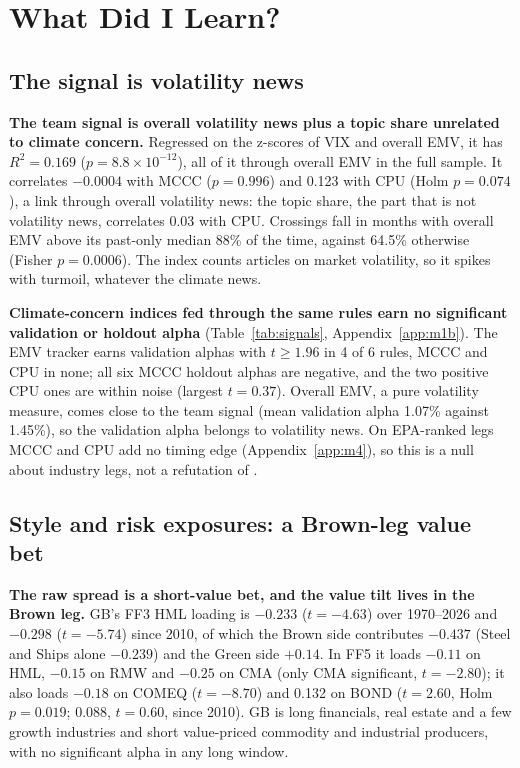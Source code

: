 \clearpage
\section{What Did I Learn?}
\label{sec:learn}

\subsection{The signal is volatility news}
\label{sec:signal}

\textbf{The team signal is overall volatility news plus a topic share unrelated to climate concern.} Regressed on the z-scores of VIX and overall EMV, it has $R^2=0.169$ ($p=8.8\times10^{-12}$), all of it through overall EMV in the full sample. It correlates $-0.0004$ with MCCC ($p=0.996$) and 0.123 with CPU (Holm $p=0.074$), a link through overall volatility news: the topic share, the part that is not volatility news, correlates 0.03 with CPU. Crossings fall in months with overall EMV above its past-only median 88\% of the time, against 64.5\% otherwise (Fisher $p=0.0006$). The index counts articles on market volatility, so it spikes with turmoil, whatever the climate news.

\textbf{Climate-concern indices fed through the same rules earn no significant validation or holdout alpha} (Table~\ref{tab:signals}, Appendix~\ref{app:m1b}). The EMV tracker earns validation alphas with $t\ge1.96$ in 4 of 6 rules, MCCC and CPU in none; all six MCCC holdout alphas are negative, and the two positive CPU ones are within noise (largest $t=0.37$). Overall EMV, a pure volatility measure, comes close to the team signal (mean validation alpha 1.07\% against 1.45\%), so the validation alpha belongs to volatility news. On EPA-ranked legs MCCC and CPU add no timing edge (Appendix~\ref{app:m4}), so this is a null about industry legs, not a refutation of \citet{pst2022}.

\subsection{Style and risk exposures: a Brown-leg value bet}
\label{sec:exposures}

\textbf{The raw spread is a short-value bet, and the value tilt lives in the Brown leg.} GB's FF3 HML loading is $-0.233$ ($t=-4.63$) over 1970--2026 and $-0.298$ ($t=-5.74$) since 2010, of which the Brown side contributes $-0.437$ (Steel and Ships alone $-0.239$) and the Green side $+0.14$. In FF5 it loads $-0.11$ on HML, $-0.15$ on RMW and $-0.25$ on CMA (only CMA significant, $t=-2.80$); it also loads $-0.18$ on COMEQ ($t=-8.70$) and 0.132 on BOND ($t=2.60$, Holm $p=0.019$; 0.088, $t=0.60$, since 2010). GB is long financials, real estate and a few growth industries and short value-priced commodity and industrial producers, with no significant alpha in any long window.


